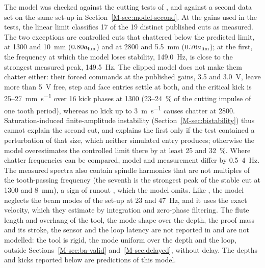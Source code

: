 The model was checked against the cutting tests of \citet{ozsoy2026robust}, and against a second data set on the same set-up in Section~\ref{M-sec:model-second}. At the gains used in the tests, the linear limit classifies 17 of the 19 distinct published cuts as measured. The two exceptions are controlled cuts that chattered below the predicted limit, at \SI{1300}{\rpm} and \SI{10}{\milli\metre} ($0.80a_{\lim}$) and at \SI{2800}{\rpm} and \SI{5.5}{\milli\metre} ($0.76a_{\lim}$); at the first, the frequency at which the model loses stability, \SI{149.0}{\hertz}, is close to the strongest measured peak, \SI{149.5}{\hertz}. The clipped model does not make them chatter either: their forced commands at the published gains, 3.5 and \SI{3.0}{\volt}, leave more than \SI{5}{\volt} free, step and face entries settle at both, and the critical kick is 25--\SI{27}{\milli\metre\per\second} over 16 kick phases at \SI{1300}{\rpm} (23--\SI{24}{\percent} of the cutting impulse of one tooth period), whereas no kick up to \SI{3}{\metre\per\second} causes chatter at \SI{2800}{\rpm}. Saturation-induced finite-amplitude instability (Section~\ref{M-sec:bistability}) thus cannot explain the second cut, and explains the first only if the test contained a perturbation of that size, which neither simulated entry produces; otherwise the model overestimates the controlled limit there by at least 25 and \SI{32}{\percent}.
Where chatter frequencies can be compared, model and measurement differ by 0.5--\SI{4}{\hertz}. The measured spectra also contain spindle harmonics that are not multiples of the tooth-passing frequency (the seventh is the strongest peak of the stable cut at \SI{1300}{\rpm} and \SI{8}{\milli\metre}), a sign of runout \citep{insperger2008chatter}, which the model omits. Like \citet{ozsoy2026robust}, the model neglects the beam modes of the set-up at 23 and \SI{47}{\hertz}, and it uses the exact velocity, which they estimate by integration and zero-phase filtering. The flute length and overhang of the tool, the mode shape over the depth, the proof mass and its stroke, the sensor and the loop latency are not reported in \citet{ozsoy2026robust} and are not modelled: the tool is rigid, the mode uniform over the depth and the loop, outside Sections~\ref{M-sec:ba-valid} and~\ref{M-sec:delayed}, without delay. The depths and kicks reported below are predictions of this model.
